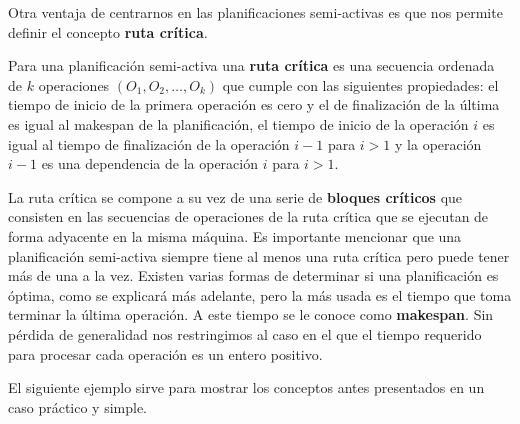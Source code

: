 %
Otra ventaja de centrarnos en las planificaciones semi-activas es que nos permite definir el concepto \textbf{ruta crítica}. 

%
Para una planificación semi-activa una \textbf{ruta crítica} es una secuencia ordenada de $k$ operaciones $(O_1,O_2,\dots,O_k)$ que cumple con las siguientes propiedades: el tiempo de inicio de la primera operación es cero y el de finalización de la última es igual al makespan de la planificación, el tiempo de inicio de la operación $i$ es igual al tiempo de finalización de la operación $i-1$ para $i>1$ y la operación $i-1$ es una dependencia de la operación $i$ para $i>1$.  

%
La ruta crítica se compone a su vez de una serie de \textbf{bloques críticos} que consisten en las secuencias de operaciones de la ruta crítica que se ejecutan de forma 
adyacente en la misma máquina. 
%
Es importante mencionar que una planificación semi-activa siempre tiene al menos una ruta crítica pero puede tener más de una a la vez.
%
Existen varias formas de determinar si una planificación es óptima, como se explicará más adelante, pero la más usada es el tiempo que toma terminar la última operación.
%
A este tiempo se le conoce como \textbf{makespan}. 
%
Sin pérdida de generalidad nos restringimos al caso en el que el tiempo requerido para procesar cada operación es un entero positivo.


%
El siguiente ejemplo sirve para mostrar los conceptos antes presentados en un caso práctico y simple.

